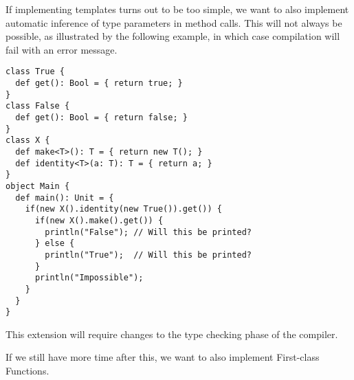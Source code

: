 If implementing templates turns out to be too simple, we want to also implement
automatic inference of type parameters in method calls. This will not always be
possible, as illustrated by the following example, in which case compilation
will fail with an error message.

\begin{lstlisting}
class True {
  def get(): Bool = { return true; }
}
class False {
  def get(): Bool = { return false; }
}
class X {
  def make<T>(): T = { return new T(); }
  def identity<T>(a: T): T = { return a; }
}
object Main {
  def main(): Unit = {
    if(new X().identity(new True()).get()) {
      if(new X().make().get()) {
        println("False"); // Will this be printed?
      } else {
        println("True");  // Will this be printed?
      }
      println("Impossible");
    }
  }
}
\end{lstlisting}

This extension will require changes to the type checking phase of the compiler.

If we still have more time after this, we want to also implement First-class
Functions.
